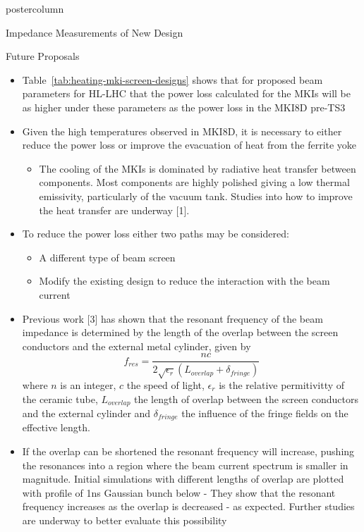 \documentclass[final,hyperref={pdfpagelabels=false}]{beamer}
\begin{document}
\begin{frame}
\begin{columns}
\begin{column}{.49\textwidth}
\begin{beamercolorbox}[center,wd=\textwidth]{postercolumn}
\begin{minipage}[T]{.95\textwidth}
{\begin{block}{Impedance Measurements of New Design}
\end{block}
\vfill
\begin{block}{Future Proposals}
\begin{itemize}
\item{Table~\ref{tab:heating-mki-screen-designs} shows that for proposed beam parameters for HL-LHC that the power loss calculated for the MKIs will be as higher under these parameters as the power loss in the MKI8D pre-TS3}
\item{Given the high temperatures observed in MKI8D, it is necessary to either reduce the power loss or improve the evacuation of heat from the ferrite yoke}
\begin{itemize}
\item{The cooling of the MKIs is dominated by radiative heat transfer between components. Most components are highly polished giving a low thermal emissivity, particularly of the vacuum tank. Studies into how to improve the heat transfer are underway [1].}
\end{itemize}
\item{To reduce the power loss either two paths may be considered:}
\begin{itemize}
\item{A different type of beam screen}
\item{Modify the existing design to reduce the interaction with the beam current}
\end{itemize}
\item{Previous work [3] has shown that the resonant frequency of the beam impedance is determined by the length of the overlap between the screen conductors and the external metal cylinder, given by }
\begin{equation}
f_{res} = \frac{n c}{2 \sqrt{\epsilon_{r}}\left( L_{overlap} + \delta_{fringe} \right)}
\end{equation}
where $n$ is an integer, $c$ the speed of light, $\epsilon_{r}$ is the relative permitivitty of the ceramic tube, $L_{overlap}$ the length of overlap between the screen conductors and the external cylinder and $\delta_{fringe}$ the influence of the fringe fields on the effective length.
\item{If the overlap can be shortened the resonant frequency will increase, pushing the resonances into a region where the beam current spectrum is smaller in magnitude. Initial simulations with  different lengths of overlap are plotted with profile of 1ns Gaussian bunch below - They show that the resonant frequency increases as the overlap is decreased - as expected. Further studies are underway to better evaluate this possibility}

\end{itemize}
\end{block}}
\end{minipage}
\end{beamercolorbox}
\end{column}
\end{columns}
\end{frame}
\end{document}
